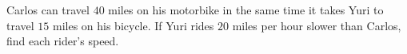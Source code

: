 Carlos can travel $40$ miles on his motorbike in the same time it takes Yuri to travel $15$ miles on his bicycle. If Yuri rides $20$ miles per hour slower than Carlos, find each rider's speed.

